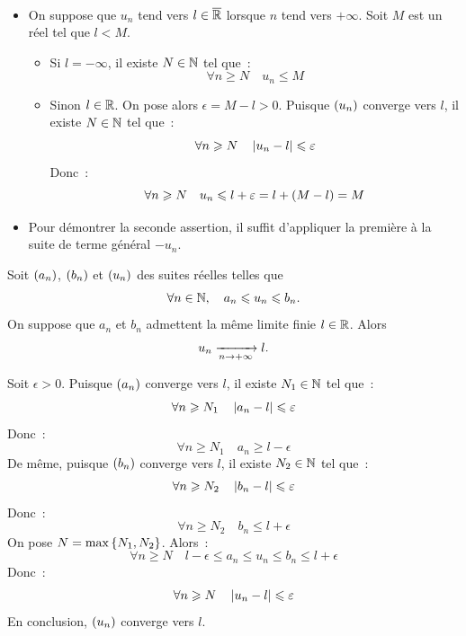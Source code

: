 \documentclass{magnoliaold}
\begin{document}
\begin{preuve}
$\quad$
\begin{itemize}
\item On suppose que $u_n$ tend vers $l\in\overline{\mathbb{R}}$ lorsque $n$ tend vers
  $+\infty$. Soit $M$ est un réel tel que $l < M$.
  \begin{itemize}
  \item Si $l=-\infty$, il existe $N\in\mathbb{N}$ tel que~:
    \[\forall n\geq N \quad u_n \leq M\]
  \item Sinon $l\in\mathbb{R}$. On pose alors $\epsilon=M-l>0$. Puisque $\left(u_n\right)$
    converge vers $l$, il existe $N\in\mathbb{N}$ tel que~:
    \[\forall n\geqslant N \quad \left|u_n-l\right|\leqslant \varepsilon\]
    Donc~:
    \[\forall n\geqslant N \quad u_n \leqslant l+\varepsilon=l+\left(M-l\right)=M\]
  \end{itemize}
\item Pour démontrer la seconde assertion, il suffit d'appliquer la première
  à la suite de terme général $-u_n$.
\end{itemize}
\end{preuve}


\begin{theoreme}[utile=-3, nom={Théorème des gendarmes}]
Soit $\left(a_n\right)$, $\left(b_n\right)$ et $\left(u_n\right)$ des suites réelles telles que
\[\forall n\in\mathbb{N} ,\quad a_n\leqslant u_n\leqslant b_n.\]
On suppose que $a_n$ et $b_n$ admettent la même limite finie $l\in\mathbb{R}$. Alors
\[u_n\xrightarrow[n\rightarrow +\infty]{} l.\]
\end{theoreme}

\begin{preuve}
Soit $\epsilon>0$. Puisque $\left(a_n\right)$ converge vers $l$, il existe $N_1\in\mathbb{N}$
tel que~:
\[\forall n\geqslant N_1 \quad \left|a_n-l\right|\leqslant \varepsilon\]
Donc~:
\[\forall n\geq N_1 \quad a_n\geq l-\epsilon\]
De même, puisque $\left(b_n\right)$ converge vers $l$, il existe $N_2\in\mathbb{N}$ tel que~:
\[\forall n\geqslant N_2 \quad \left|b_n-l\right|\leqslant \varepsilon\]
Donc~:
\[\forall n\geq N_2 \quad b_n\leq l+\epsilon\]
On pose $N=\max\left\{N_1,N_2\right\}$. Alors~:
\[\forall n\geq N \quad l-\epsilon \leq a_n \leq u_n \leq b_n \leq
  l+\epsilon\]
Donc~:
\[\forall n\geqslant N \quad \left|u_n-l\right|\leqslant\varepsilon\]
En conclusion, $\left(u_n\right)$ converge vers $l$.
\end{preuve}
\end{document}

